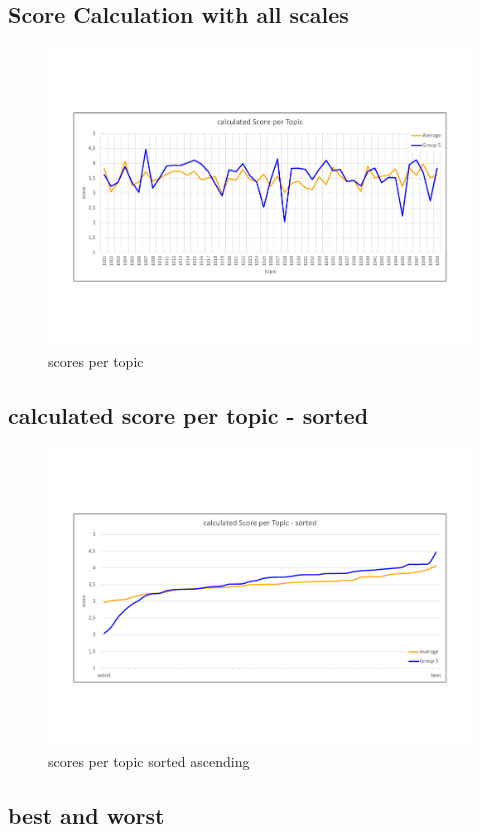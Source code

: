 \subsection{Score Calculation with all scales}

\begin{figure}[H]
	\centering
	\includegraphics[trim= 0 150 0 150,width=\textwidth]{img/score_per_topic.pdf}
	\caption{scores per topic}
	\label{fig:spt}
\end{figure}


\subsection{calculated score per topic - sorted}

\begin{figure}[H]
	\centering
	\includegraphics[trim= 0 150 0 150,width=\textwidth]{img/score_per_topic_sorted.pdf}
	\caption{scores per topic sorted ascending}
	\label{fig:spts}
\end{figure}

\subsection{best and worst}